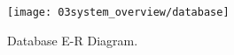 %
%
%
%
%

\begin{figure}[ht]
        \centering
        \texttt{[image: 03system\_overview/database]}
        \caption{Database E-R Diagram.}
        \label{fig:Database}
\end{figure}

